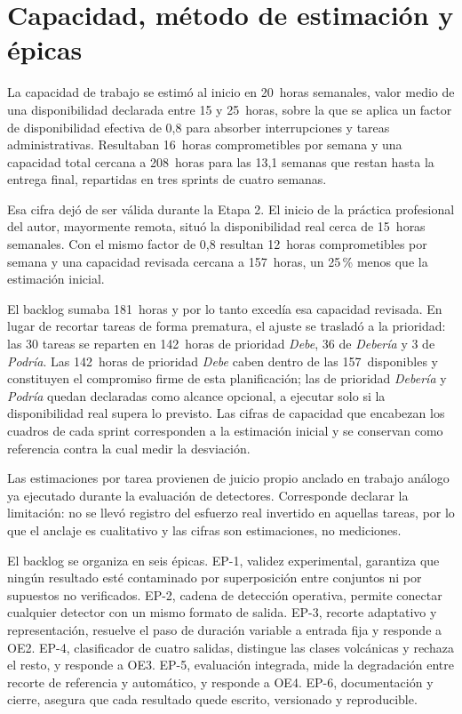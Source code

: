 \section{Capacidad, método de estimación y épicas}
\label{sec:anexo-planificacion}

La capacidad de trabajo se estimó al inicio en 20~horas semanales, valor medio de
una disponibilidad declarada entre 15 y 25~horas, sobre la que se aplica un factor
de disponibilidad efectiva de 0,8 para absorber interrupciones y tareas
administrativas. Resultaban 16~horas comprometibles por semana y una capacidad
total cercana a 208~horas para las 13,1 semanas que restan hasta la entrega final,
repartidas en tres sprints de cuatro semanas.

Esa cifra dejó de ser válida durante la Etapa 2. El inicio de la práctica
profesional del autor, mayormente remota, situó la disponibilidad real cerca de
15~horas semanales. Con el mismo factor de 0,8
resultan 12~horas comprometibles por semana y una capacidad revisada cercana a
157~horas, un 25\,\% menos que la estimación inicial.

El backlog sumaba 181~horas y por lo tanto excedía esa capacidad revisada. En
lugar de recortar tareas de forma prematura, el ajuste se trasladó a la
prioridad: las 30
tareas se reparten en 142~horas de prioridad \emph{Debe}, 36 de \emph{Debería} y 3
de \emph{Podría}. Las 142~horas de prioridad \emph{Debe} caben dentro de las
157~disponibles y constituyen el compromiso firme de esta planificación; las de
prioridad \emph{Debería} y \emph{Podría} quedan declaradas como alcance opcional,
a ejecutar solo si la disponibilidad real supera lo previsto. Las cifras de
capacidad que encabezan los cuadros de cada sprint corresponden a la estimación
inicial y se conservan como referencia contra la cual medir la desviación.

Las estimaciones por tarea provienen de juicio propio anclado en trabajo análogo
ya ejecutado durante la evaluación de detectores. Corresponde declarar la
limitación: no se llevó registro del esfuerzo real invertido en aquellas tareas,
por lo que el anclaje es cualitativo y las cifras son estimaciones, no
mediciones.

El backlog se organiza en seis épicas. EP-1, validez experimental, garantiza
que ningún resultado esté contaminado por superposición entre conjuntos ni por
supuestos no verificados. EP-2, cadena de detección operativa, permite conectar
cualquier detector con un mismo formato de salida. EP-3, recorte adaptativo y
representación, resuelve el paso de duración variable a entrada fija y responde
a OE2. EP-4, clasificador de cuatro salidas, distingue las clases volcánicas y
rechaza el resto, y responde a OE3. EP-5, evaluación integrada, mide la
degradación entre recorte de referencia y automático, y responde a OE4. EP-6,
documentación y cierre, asegura que cada resultado quede escrito, versionado y
reproducible.

